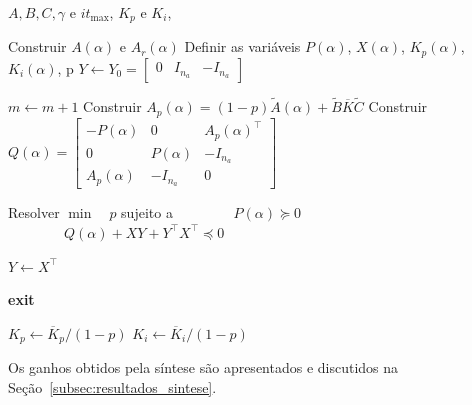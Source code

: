 \begin{algorithm}[htbp]
    \caption{Projeto iterativo do controlador PI por meio de LMIs}
    \label{alg:sintese_pi_lmi}
    \begin{algorithmic}[1]
        \Require $A,B,C,\gamma$ e $it_{\max}$,
        \Ensure $K_p$ e $K_i$,

        \State Construir $A(\alpha)$ e $A_r(\alpha)$
        \State Definir as variáveis $P(\alpha)$, $X(\alpha)$, $K_p(\alpha)$, $K_i(\alpha)$, p
        \State $Y \gets Y_0 = \begin{bmatrix}0&I_{n_a}&-I_{n_a}\end{bmatrix}$

            \State $m\gets m+1$
            \State Construir $A_p(\alpha)=(1-p)\widetilde A(\alpha)+\widetilde B\overline K\widetilde C$
            \State Construir
                $Q(\alpha)=
                \begin{bmatrix}
                -P(\alpha)&0&A_p(\alpha)^\top\\
                0&P(\alpha)&-I_{n_a}\\
                A_p(\alpha)&-I_{n_a}&0
                \end{bmatrix}$

            \State Resolver
            \Statex \hspace{\algorithmicindent}
            $\displaystyle\min \quad p$
            \Statex \hspace{\algorithmicindent}
            sujeito a
            \Statex \hspace{\algorithmicindent}
            $ \qquad \qquad P(\alpha)\succeq0$
            \Statex \hspace{\algorithmicindent}
            $ \qquad \qquad Q(\alpha)+XY
            +Y^\top X^\top\preceq0$

            \State $Y\gets X^\top$

                \State \textbf{exit}
            \EndIf
        \EndWhile

            \State $K_p\gets\overline K_p/(1-p)$
            \State $K_i\gets\overline K_i/(1-p)$
        \EndIf

    \end{algorithmic}
\end{algorithm}

\noindent
Os ganhos obtidos pela síntese são apresentados e discutidos na Seção~\ref{subsec:resultados_sintese}.

\newpage
